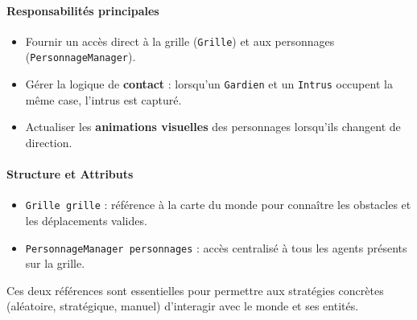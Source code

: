 \vspace{1em}
\paragraph{Responsabilités principales}
\begin{itemize}
    \item Fournir un accès direct à la grille (\texttt{Grille}) et aux personnages (\texttt{PersonnageManager}).
    \item Gérer la logique de \textbf{contact} : lorsqu’un \texttt{Gardien} et un \texttt{Intrus} occupent la même case, l’intrus est capturé.
    \item Actualiser les \textbf{animations visuelles} des personnages lorsqu'ils changent de direction.
\end{itemize}

\vspace{1em}
\paragraph{Structure et Attributs}
\begin{itemize}
    \item \texttt{Grille grille} : référence à la carte du monde pour connaître les obstacles et les déplacements valides.
    \item \texttt{PersonnageManager personnages} : accès centralisé à tous les agents présents sur la grille.
\end{itemize}

Ces deux références sont essentielles pour permettre aux stratégies concrètes (aléatoire, stratégique, manuel) d’interagir avec le monde et ses entités.

\vspace{1em}
